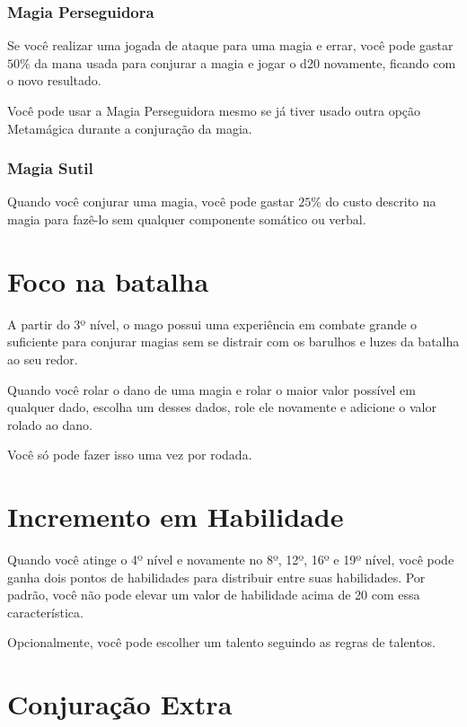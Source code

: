 \documentclass{RPG_Adventure}[2021/10/20]
\begin{document}
\begin{multicols}{2}
\subsubsection*{Magia Perseguidora}%

Se você realizar uma jogada de ataque para uma magia e errar, você pode gastar
$50\%$ da mana usada para conjurar a magia e jogar o d20 novamente, ficando com
o novo resultado.

Você pode usar a Magia Perseguidora mesmo se já tiver usado outra opção
Metamágica durante a conjuração da magia.

\subsubsection*{Magia Sutil}%

Quando você conjurar uma magia, você pode gastar $25\%$ do custo descrito na
magia para fazê-lo sem qualquer componente somático ou verbal.

\section*{Foco na batalha}%

A partir do 3º nível, o mago possui uma experiência em combate grande o
suficiente para conjurar magias sem se distrair com os barulhos e luzes da
batalha ao seu redor.

Quando você rolar o dano de uma magia e rolar o maior valor possível em qualquer
dado, escolha um desses dados, role ele novamente e adicione o valor rolado ao
dano.

Você só pode fazer isso uma vez por rodada.

\section*{Incremento em Habilidade}%

Quando você atinge o 4º nível e novamente no 8º, 12º, 16º e 19º nível, você pode
ganha dois pontos de habilidades para distribuir entre suas habilidades. Por
padrão, você não pode elevar um valor de habilidade acima de 20 com essa
característica.

Opcionalmente, você pode escolher um talento seguindo as regras de talentos.

\section*{Conjuração Extra}%


\end{multicols}
\end{document}

